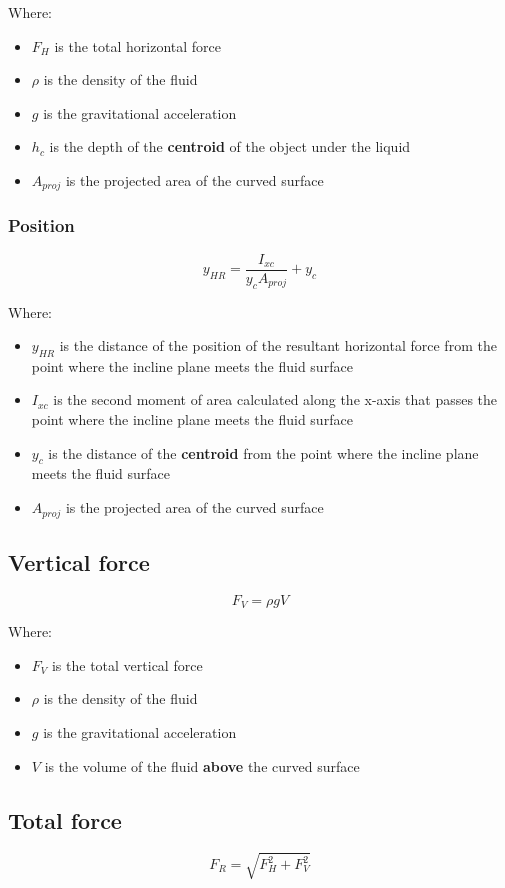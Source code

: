 \documentclass[11pt]{article}
\begin{document}
Where:
\begin{itemize}
\item \(F_H\) is the total horizontal force
\item \(\rho\) is the density of the fluid
\item \(g\) is the gravitational acceleration
\item \(h_c\) is the depth of the \textbf{centroid} of the object under the liquid
\item \(A_{proj}\) is the projected area of the curved surface
\end{itemize}

\subsubsection{Position}
\label{sec:org1025773}
\[y_{HR} = \frac{I_{xc}}{y_c A_{proj}} + y_c\]

Where:
\begin{itemize}
\item \(y_{HR}\) is the distance of the position of the resultant horizontal force from the point where the incline plane meets the fluid surface
\item \(I_{xc}\) is the second moment of area calculated along the x-axis that passes the point where the incline plane meets the fluid surface
\item \(y_c\) is the distance of the \textbf{centroid} from the point where the incline plane meets the fluid surface
\item \(A_{proj}\) is the projected area of the curved surface
\end{itemize}

\subsection{Vertical force}
\label{sec:org92a86c3}
\[F_V = \rho g V\]

Where:
\begin{itemize}
\item \(F_V\) is the total vertical force
\item \(\rho\) is the density of the fluid
\item \(g\) is the gravitational acceleration
\item \(V\) is the volume of the fluid \textbf{above} the curved surface
\end{itemize}

\subsection{Total force}
\label{sec:org4c426d0}
\[F_R = \sqrt{F_H^2 + F_V^2}\]
\end{document}
